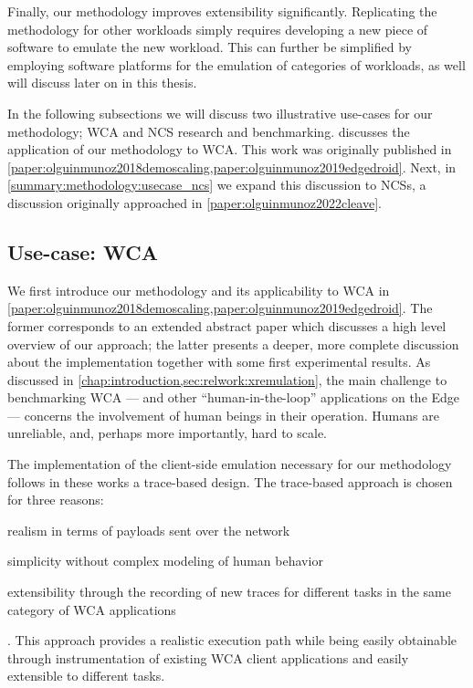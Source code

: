Finally, our methodology improves extensibility significantly.
Replicating the methodology for other workloads simply requires developing a new piece of software to emulate the new workload.
This can further be simplified by employing software platforms for the emulation of categories of workloads, as well will discuss later on in this thesis.

\medskip
In the following subsections we will discuss two illustrative use-cases for our methodology; \acl{WCA} and \acl{NCS} research and benchmarking.
 discusses the application of our methodology to \gls{WCA}.
This work was originally published in \cref{paper:olguinmunoz2018demoscaling,paper:olguinmunoz2019edgedroid}.
Next, in \cref{summary:methodology:usecase_ncs} we expand this discussion to \glspl{NCS}, a discussion originally approached in \cref{paper:olguinmunoz2022cleave}.

\subsection{Use-case: \acl{WCA}}\label{summary:methodology:usecase_wca}

We first introduce our methodology and its applicability to \gls{WCA} in \cref{paper:olguinmunoz2018demoscaling,paper:olguinmunoz2019edgedroid}.
The former corresponds to an extended abstract paper which discusses a high level overview of our approach;
the latter presents a deeper, more complete discussion about the implementation together with some first experimental results.
As discussed in \cref{chap:introduction,sec:relwork:xremulation}, the main challenge to benchmarking \gls{WCA} --- and other ``human-in-the-loop'' applications on the Edge --- concerns the involvement of human beings in their operation.
Humans are unreliable, and, perhaps more importantly, hard to scale.

The implementation of the client-side emulation necessary for our methodology follows in these works a trace-based design.
The trace-based approach is chosen for three reasons:
\begin{inlineenum}
    \item realism in terms of payloads sent over the network
    \item simplicity without complex modeling of human behavior
    \item extensibility through the recording of new traces for different tasks in the same category of WCA applications
\end{inlineenum}.
This approach provides a realistic execution path while being easily obtainable through instrumentation of existing WCA client applications and easily extensible to different tasks.

